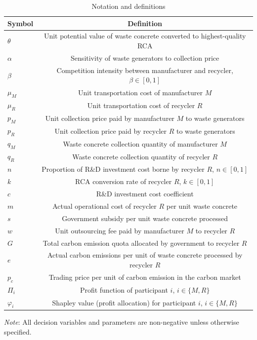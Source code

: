 \documentclass[authoryear,preprint,review,times,10pt]{elsarticle}
\begin{document}
\begin{table}[!htbp]
\centering
\captionsetup{font=normalsize, labelsep=period}
\caption{Notation and definitions}
\label{tab:notation}
\normalsize
\begin{threeparttable}
\begin{tabular*}{0.9\textwidth}{@{\extracolsep{\fill}}lc}
\toprule
\textbf{Symbol} & \textbf{Definition} \\
\midrule
$\theta$ & Unit potential value of waste concrete converted to highest-quality RCA \\
$\alpha$ & Sensitivity of waste generators to collection price \\
$\beta$ & Competition intensity between manufacturer and recycler, $\beta \in [0,1]$ \\
$\mu_M$ & Unit transportation cost of manufacturer $M$ \\
$\mu_R$ & Unit transportation cost of recycler $R$ \\
$p_M$ & Unit collection price paid by manufacturer $M$ to waste generators \\
$p_R$ & Unit collection price paid by recycler $R$ to waste generators \\
$q_M$ & Waste concrete collection quantity of manufacturer $M$ \\
$q_R$ & Waste concrete collection quantity of recycler $R$ \\
$n$ & Proportion of R\&D investment cost borne by recycler $R$, $n \in [0,1]$ \\
$k$ & RCA conversion rate of recycler $R$, $k \in [0,1]$ \\
$c$ & R\&D investment cost coefficient \\
$m$ & Actual operational cost of recycler $R$ per unit waste concrete \\
$s$ & Government subsidy per unit waste concrete processed \\
$w$ & Unit outsourcing fee paid by manufacturer $M$ to recycler $R$ \\
$G$ & Total carbon emission quota allocated by government to recycler $R$ \\
$e$ & Actual carbon emissions per unit of waste concrete processed by recycler $R$ \\
$p_c$ & Trading price per unit of carbon emission in the carbon market \\
$\Pi_i$ & Profit function of participant $i$, $i \in \{M,R\}$ \\
$\varphi_i$ & Shapley value (profit allocation) for participant $i$, $i \in \{M,R\}$ \\
\bottomrule
\end{tabular*}
\begin{tablenotes}[flushleft]
\small\linespread{1}\selectfont
\item \textit{Note}: All decision variables and parameters are non-negative unless otherwise specified.
\end{tablenotes}
\end{threeparttable}
\end{table}
\vspace{10pt}
\normalsize
\end{document}
